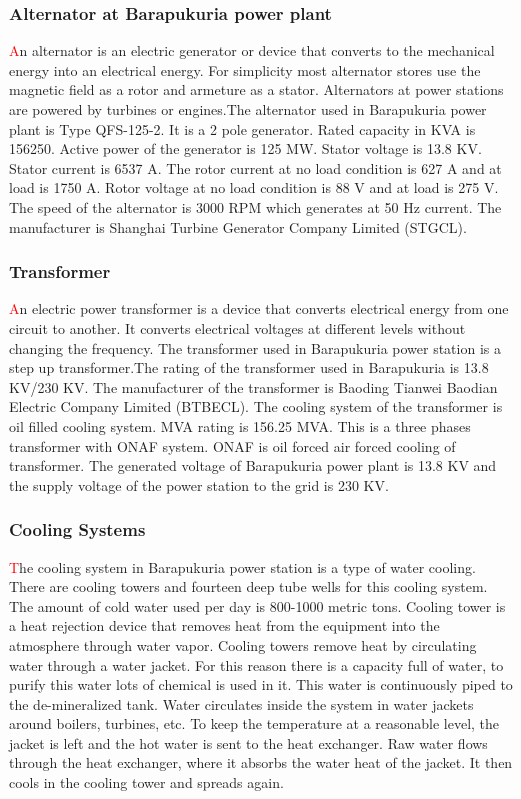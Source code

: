 \documentclass[11 pt]{article}
\begin{document}
\subsubsection{Alternator at Barapukuria power plant}
{\huge\textcolor{red}{\hspace{5 mm}A}}n alternator is an electric generator or device that converts to the mechanical energy into an electrical energy. For simplicity most alternator stores use the magnetic field as a rotor and armeture as a stator. Alternators at power stations are powered by turbines or engines.The alternator used in Barapukuria power plant is Type QFS-125-2. It is a 2 pole generator. Rated capacity in KVA is 156250. Active power of the generator is 125 MW. Stator voltage is 13.8 KV. Stator current is 6537 A. The rotor current at no load condition is 627 A and at load is 1750 A. Rotor voltage at no load condition is 88 V and at load is 275 V. The speed of the alternator is 3000 RPM which generates at 50 Hz current. The manufacturer is Shanghai Turbine Generator Company Limited (STGCL).
\subsubsection{Transformer}
{\huge\textcolor{red}{\hspace{5 mm}A}}n electric power transformer is a device that converts electrical energy from one circuit to another. It converts electrical voltages at different levels without changing the frequency. The transformer used in Barapukuria power station is a step up transformer.The rating of the transformer used in Barapukuria is 13.8 KV/230 KV. The manufacturer of the transformer is Baoding Tianwei Baodian Electric Company Limited (BTBECL). The cooling system of the transformer is oil filled cooling system. MVA rating is 156.25 MVA. This is a three phases transformer with ONAF system. ONAF is oil forced air forced cooling of transformer. The generated voltage of Barapukuria power plant is 13.8 KV and the supply voltage of the power station to the grid is 230 KV.
\subsubsection{Cooling Systems}
{\huge\textcolor{red}{\hspace{5 mm}T}}he cooling system in Barapukuria power station is a type of water cooling. There are cooling towers and fourteen deep tube wells for this cooling system. The amount of cold water used per day is 800-1000 metric tons. Cooling tower is a heat rejection device that removes heat from the equipment into the atmosphere through water vapor. Cooling towers remove heat by circulating water through a water jacket. For this reason there is a capacity full of water, to purify this water lots of chemical is used in it. This water is continuously piped to the de-mineralized tank. Water circulates inside the system in water jackets around boilers, turbines, etc. To keep the temperature at a reasonable level, the jacket is left and the hot water is sent to the heat exchanger. Raw water flows through the heat exchanger, where it absorbs the water heat of the jacket. It then cools in the cooling tower and spreads again.
\end{document}
